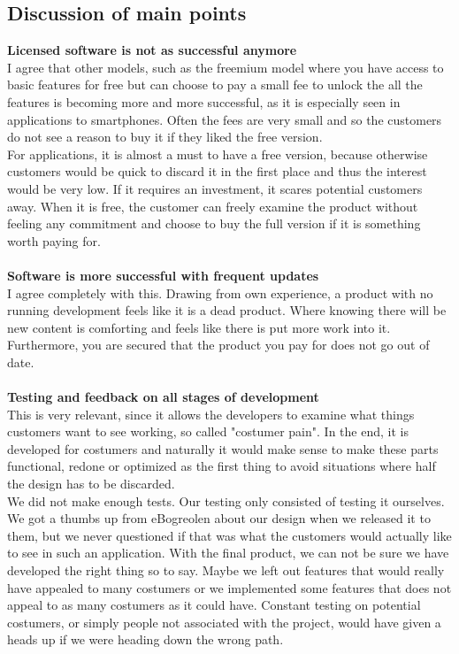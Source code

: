 \documentclass[12pt]{article}
\begin{document}
\subsection{Discussion of main points}
\textbf{Licensed software is not as successful anymore}\\
I agree that other models, such as the freemium model where you have access to basic features for free but can choose to pay a small fee to unlock the all the features is becoming more and more successful, as it is especially seen in applications to smartphones. Often the fees are very small and so the customers do not see a reason to buy it if they liked the free version. \\
For applications, it is almost a must to have a free version, because otherwise customers would be quick to discard it in the first place and thus the interest would be very low. If it requires an investment, it scares potential customers away. When it is free, the customer can freely examine the product without feeling any commitment and choose to buy the full version if it is something worth paying for.\\
\\
\textbf{Software is more successful with frequent updates}\\
I agree completely with this. Drawing from own experience, a product with no running development feels like it is a dead product. Where knowing there will be new content is comforting and feels like there is put more work into it. Furthermore, you are secured that the product you pay for does not go out of date. \\
\\
\textbf{Testing and feedback on all stages of development}\\
This is very relevant, since it allows the developers to examine what things customers want to see working, so called "costumer pain". In the end, it is developed for costumers and naturally it would make sense to make these parts functional, redone or optimized as the first thing to avoid situations where half the design has to be discarded.\\
We did not make enough tests. Our testing only consisted of testing it ourselves. We got a thumbs up from eBogreolen about our design when we released it to them, but we never questioned if that was what the customers would actually like to see in such an application. With the final product, we can not be sure we have developed the right thing so to say. Maybe we left out features that would really have appealed to many costumers or we implemented some features that does not appeal to as many costumers as it could have. Constant testing on potential costumers, or simply people not associated with the project, would have given a heads up if we were heading down the wrong path.\\
\end{document}
